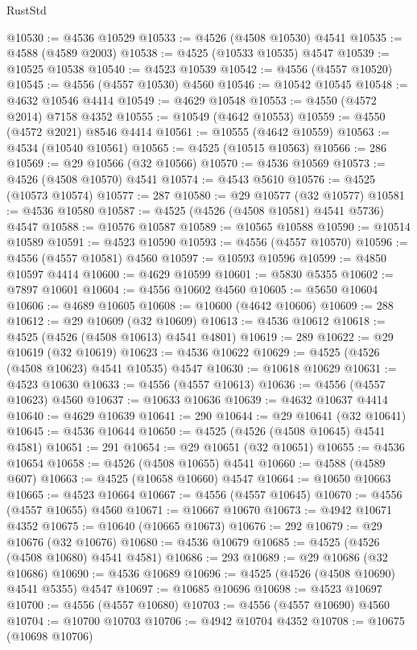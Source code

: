 \begin{lexlean}{RustStd}
\begin{coremodule}
@10530 := @4536 @10529
@10533 := @4526 (@4508 @10530) @4541
@10535 := @4588 (@4589 @2003)
@10538 := @4525 (@10533 @10535) @4547
@10539 := @10525 @10538
@10540 := @4523 @10539
@10542 := @4556 (@4557 @10520)
@10545 := @4556 (@4557 @10530) @4560
@10546 := @10542 @10545
@10548 := @4632 @10546 @4414
@10549 := @4629 @10548
@10553 := @4550 (@4572 @2014) @7158 @4352
@10555 := @10549 (@4642 @10553)
@10559 := @4550 (@4572 @2021) @8546 @4414
@10561 := @10555 (@4642 @10559)
@10563 := @4534 (@10540 @10561)
@10565 := @4525 (@10515 @10563)
@10566 := 286
@10569 := @29 @10566 (@32 @10566)
@10570 := @4536 @10569
@10573 := @4526 (@4508 @10570) @4541
@10574 := @4543 @5610
@10576 := @4525 (@10573 @10574)
@10577 := 287
@10580 := @29 @10577 (@32 @10577)
@10581 := @4536 @10580
@10587 := @4525 (@4526 (@4508 @10581) @4541 @5736) @4547
@10588 := @10576 @10587
@10589 := @10565 @10588
@10590 := @10514 @10589
@10591 := @4523 @10590
@10593 := @4556 (@4557 @10570)
@10596 := @4556 (@4557 @10581) @4560
@10597 := @10593 @10596
@10599 := @4850 @10597 @4414
@10600 := @4629 @10599
@10601 := @5830 @5355
@10602 := @7897 @10601
@10604 := @4556 @10602 @4560
@10605 := @5650 @10604
@10606 := @4689 @10605
@10608 := @10600 (@4642 @10606)
@10609 := 288
@10612 := @29 @10609 (@32 @10609)
@10613 := @4536 @10612
@10618 := @4525 (@4526 (@4508 @10613) @4541 @4801)
@10619 := 289
@10622 := @29 @10619 (@32 @10619)
@10623 := @4536 @10622
@10629 := @4525 (@4526 (@4508 @10623) @4541 @10535) @4547
@10630 := @10618 @10629
@10631 := @4523 @10630
@10633 := @4556 (@4557 @10613)
@10636 := @4556 (@4557 @10623) @4560
@10637 := @10633 @10636
@10639 := @4632 @10637 @4414
@10640 := @4629 @10639
@10641 := 290
@10644 := @29 @10641 (@32 @10641)
@10645 := @4536 @10644
@10650 := @4525 (@4526 (@4508 @10645) @4541 @4581)
@10651 := 291
@10654 := @29 @10651 (@32 @10651)
@10655 := @4536 @10654
@10658 := @4526 (@4508 @10655) @4541
@10660 := @4588 (@4589 @607)
@10663 := @4525 (@10658 @10660) @4547
@10664 := @10650 @10663
@10665 := @4523 @10664
@10667 := @4556 (@4557 @10645)
@10670 := @4556 (@4557 @10655) @4560
@10671 := @10667 @10670
@10673 := @4942 @10671 @4352
@10675 := @10640 (@10665 @10673)
@10676 := 292
@10679 := @29 @10676 (@32 @10676)
@10680 := @4536 @10679
@10685 := @4525 (@4526 (@4508 @10680) @4541 @4581)
@10686 := 293
@10689 := @29 @10686 (@32 @10686)
@10690 := @4536 @10689
@10696 := @4525 (@4526 (@4508 @10690) @4541 @5355) @4547
@10697 := @10685 @10696
@10698 := @4523 @10697
@10700 := @4556 (@4557 @10680)
@10703 := @4556 (@4557 @10690) @4560
@10704 := @10700 @10703
@10706 := @4942 @10704 @4352
@10708 := @10675 (@10698 @10706)

\end{coremodule}
\end{lexlean}
